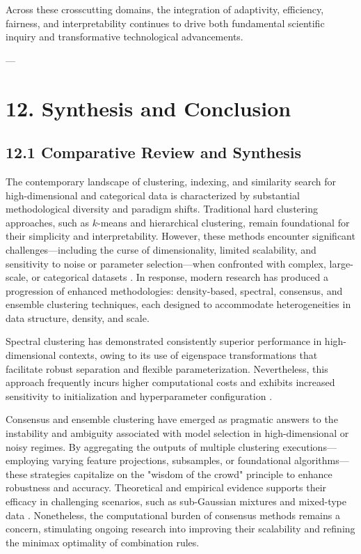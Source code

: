 \documentclass[11pt]{article}
\begin{document}
Across these crosscutting domains, the integration of adaptivity, efficiency, fairness, and interpretability continues to drive both fundamental scientific inquiry and transformative technological advancements.

---
\section{12. Synthesis and Conclusion}

\subsection{12.1 Comparative Review and Synthesis}

The contemporary landscape of clustering, indexing, and similarity search for high-dimensional and categorical data is characterized by substantial methodological diversity and paradigm shifts. Traditional hard clustering approaches, such as $k$-means and hierarchical clustering, remain foundational for their simplicity and interpretability. However, these methods encounter significant challenges—including the curse of dimensionality, limited scalability, and sensitivity to noise or parameter selection—when confronted with complex, large-scale, or categorical datasets \cite{ref20,ref29,ref80}. In response, modern research has produced a progression of enhanced methodologies: density-based, spectral, consensus, and ensemble clustering techniques, each designed to accommodate heterogeneities in data structure, density, and scale.

Spectral clustering has demonstrated consistently superior performance in high-dimensional contexts, owing to its use of eigenspace transformations that facilitate robust separation and flexible parameterization. Nevertheless, this approach frequently incurs higher computational costs and exhibits increased sensitivity to initialization and hyperparameter configuration \cite{ref81,ref14,ref19}.

Consensus and ensemble clustering have emerged as pragmatic answers to the instability and ambiguity associated with model selection in high-dimensional or noisy regimes. By aggregating the outputs of multiple clustering executions—employing varying feature projections, subsamples, or foundational algorithms—these strategies capitalize on the "wisdom of the crowd" principle to enhance robustness and accuracy. Theoretical and empirical evidence supports their efficacy in challenging scenarios, such as sub-Gaussian mixtures and mixed-type data \cite{ref20,ref39,ref30,ref76,ref111}. Nonetheless, the computational burden of consensus methods remains a concern, stimulating ongoing research into improving their scalability and refining the minimax optimality of combination rules.
\end{document}
